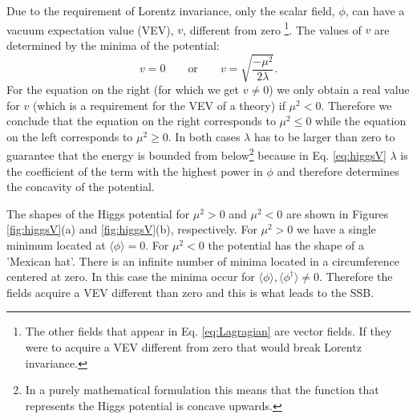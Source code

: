 Due to the requirement of Lorentz invariance, only the scalar field, $\phi$, can have a vacuum expectation value (VEV), $v$, different from zero \footnote{The other fields that appear in Eq. \ref{eq:Lagragian} are vector fields. If they were to acquire a VEV different from zero that would break Lorentz invariance.}. The values of $v$ are determined by the minima of the potential:
\begin{equation}
v=0 \qquad \text{or} \qquad v=\sqrt{\frac{-\mu^2}{2\lambda}}.
\end{equation}
For the equation on the right (for which we get $v\neq 0$) we only obtain a real value for $v$ (which is a requirement for the VEV of a theory) if $\mu^2<0$. Therefore we conclude that the equation on the right corresponds to $\mu^2\leq0$ while the equation on the left corresponds to $\mu^2\geq0$. In both cases $\lambda$ has to be larger than zero to guarantee that the energy is bounded from below\footnote{In a purely mathematical formulation this means that the function that represents the Higgs potential is concave upwards.} because in Eq. \ref{eq:higgsV} $\lambda$ is the coefficient of the term with the highest power in $\phi$ and therefore determines the concavity of the potential. 

The shapes of the Higgs potential for $\mu^2>0$ and $\mu^2<0$ are shown in Figures \ref{fig:higgsV}(a) and \ref{fig:higgsV}(b), respectively. For $\mu^2>0$ we have a single minimum located at $\langle\phi\rangle=0$. For $\mu^2<0$ the potential has the shape of a 'Mexican hat'. There is an infinite number of minima located in a circumference centered at zero. In this case the minima occur for $\langle\phi\rangle,\langle\phi^{\dagger}\rangle\neq 0$. Therefore the fields acquire a VEV different than zero and this is what leads to the SSB.


